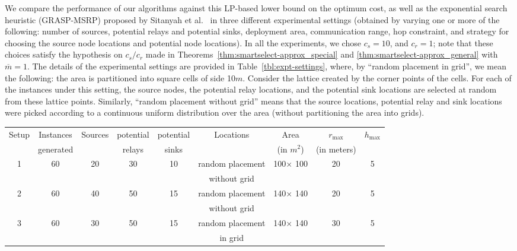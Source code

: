 \documentclass[conference]{IEEEtran}
\newcommand{\mbar}{\overline{m}}
\begin{document}
We compare the performance of our algorithms against this LP-based lower bound on the optimum cost, as well as the exponential search heuristic (GRASP-MSRP) proposed by Sitanyah et al.\ \cite{sitanayah} in three different experimental settings (obtained by varying one or more of the following: number of sources, potential relays and potential sinks, deployment area, communication range, hop constraint, and strategy for choosing the source node locations and potential node locations). In all the experiments, we chose $c_s = 10$, and $c_r = 1$; note that these choices satisfy the hypothesis on $c_s/c_r$ made in Theorems~\ref{thm:smartselect-approx_special} and \ref{thm:smartselect-approx_general} with $\mbar = 1$. The details of the experimental settings are provided in Table~\ref{tbl:expt-settings}, where, by ``random placement in grid'', we mean the following: the area is partitioned into square cells of side 10$m$. Consider the lattice created by the corner points of the cells. For each of the instances under this setting, the source nodes, the potential relay locations, and the potential sink locations are selected at random from these lattice points. Similarly, ``random placement without grid'' means that the source locations, potential relay and sink locations were picked according to a continuous uniform distribution over the area (without partitioning the area into grids).

\begin{table*}[t]
  \centering
\caption{Details of the Experimental Settings}
\label{tbl:expt-settings}
\scriptsize
  \begin{tabular}{|c|c|c|c|c|c|c|c|c|}\hline
    Setup & Instances & Sources & potential & potential & Locations & Area & $r_{\max}$ & $h_{\max}$\\
    & generated & & relays & sinks & & (in $m^2$) & (in meters) & \\
    \hline
   1 & 60 & 20 & 30 & 10 & random placement & 100$\times$ 100 & 20 & 5\\
     &    &    &    &    &  without grid    &               &    &   \\ 
  \hline
   2 & 60 & 40 & 50 & 15 & random placement & 140$\times$ 140 & 20 & 5\\
     &    &    &    &    &  without grid    &                 &    &   \\
  \hline
   3 & 60& 30 & 50 & 15 & random placement & 140$\times$ 140 & 30 & 5\\
     &    &    &    &    &  in grid         &                 &    &   \\
\hline
\end{tabular}
\normalsize
\end{table*}    
\end{document}

